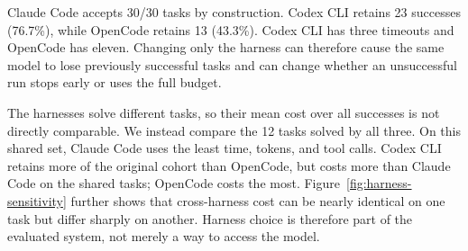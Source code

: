 Claude Code accepts 30/30 tasks by construction. Codex CLI retains 23 successes (76.7\%), while OpenCode retains 13 (43.3\%). Codex CLI has three timeouts and OpenCode has eleven. Changing only the harness can therefore cause the same model to lose previously successful tasks and can change whether an unsuccessful run stops early or uses the full budget.

The harnesses solve different tasks, so their mean cost over all successes is not directly comparable. We instead compare the 12 tasks solved by all three. On this shared set, Claude Code uses the least time, tokens, and tool calls. Codex CLI retains more of the original cohort than OpenCode, but costs more than Claude Code on the shared tasks; OpenCode costs the most. Figure~\ref{fig:harness-sensitivity} further shows that cross-harness cost can be nearly identical on one task but differ sharply on another. Harness choice is therefore part of the evaluated system, not merely a way to access the model.
